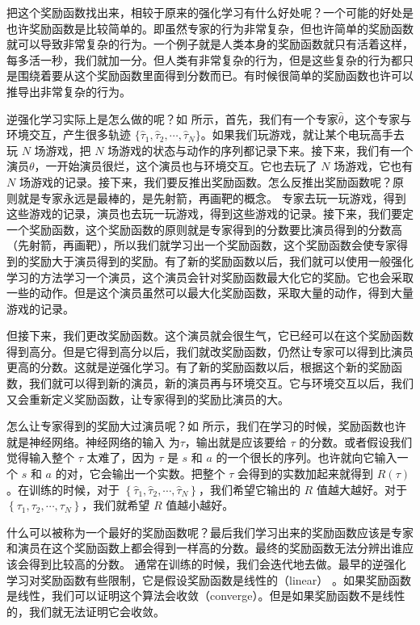 把这个奖励函数找出来，相较于原来的强化学习有什么好处呢？一个可能的好处是也许奖励函数是比较简单的。即虽然专家的行为非常复杂，但也许简单的奖励函数就可以导致非常复杂的行为。一个例子就是人类本身的奖励函数就只有活着这样，每多活一秒，我们就加一分。但人类有非常复杂的行为，但是这些复杂的行为都只是围绕着要从这个奖励函数里面得到分数而已。有时候很简单的奖励函数也许可以推导出非常复杂的行为。

逆强化学习实际上是怎么做的呢？如 所示，首先，我们有一个专家$\hat{\theta}$，这个专家与环境交互，产生很多轨迹 $\{\hat{\tau}_1,\hat{\tau}_2,\cdots,\hat{\tau}_N\}$。如果我们玩游戏，就让某个电玩高手去玩 $N$ 场游戏，把 $N$ 场游戏的状态与动作的序列都记录下来。接下来，我们有一个演员$\theta$，一开始演员很烂，这个演员也与环境交互。它也去玩了 $N$ 场游戏，它也有 $N$ 场游戏的记录。接下来，我们要反推出奖励函数。怎么反推出奖励函数呢？原则就是专家永远是最棒的，是先射箭，再画靶的概念。
专家去玩一玩游戏，得到这些游戏的记录，演员也去玩一玩游戏，得到这些游戏的记录。接下来，我们要定一个奖励函数，这个奖励函数的原则就是专家得到的分数要比演员得到的分数高（先射箭，再画靶），所以我们就学习出一个奖励函数，这个奖励函数会使专家得到的奖励大于演员得到的奖励。有了新的奖励函数以后，我们就可以使用一般强化学习的方法学习一个演员，这个演员会针对奖励函数最大化它的奖励。它也会采取一些的动作。但是这个演员虽然可以最大化奖励函数，采取大量的动作，得到大量游戏的记录。

但接下来，我们更改奖励函数。这个演员就会很生气，它已经可以在这个奖励函数得到高分。但是它得到高分以后，我们就改奖励函数，仍然让专家可以得到比演员更高的分数。这就是逆强化学习。有了新的奖励函数以后，根据这个新的奖励函数，我们就可以得到新的演员，新的演员再与环境交互。它与环境交互以后，我们又会重新定义奖励函数，让专家得到的奖励比演员的大。

怎么让专家得到的奖励大过演员呢？如 所示，我们在学习的时候，奖励函数也许就是神经网络。神经网络的输入 为$\tau$，输出就是应该要给 $\tau$ 的分数。或者假设我们觉得输入整个 $\tau$ 太难了，因为 $\tau$ 是 $s$ 和 $a$ 的一个很长的序列。也许就向它输入一个 $s$ 和 $a$ 的对，它会输出一个实数。把整个 $\tau$ 会得到的实数加起来就得到 $R(\tau)$。在训练的时候，对于 $\left\{\hat{\tau}_{1}, \hat{\tau}_{2}, \cdots, \hat{\tau}_{N}\right\}$，我们希望它输出的 $R$ 值越大越好。对于 $\left\{\tau_{1}, \tau_{2}, \cdots, \tau_{N}\right\}$，我们就希望 $R$ 值越小越好。

什么可以被称为一个最好的奖励函数呢？最后我们学习出来的奖励函数应该是专家和演员在这个奖励函数上都会得到一样高的分数。最终的奖励函数无法分辨出谁应该会得到比较高的分数。
通常在训练的时候，我们会迭代地去做。最早的逆强化学习对奖励函数有些限制，它是假设奖励函数是线性的（linear） 。如果奖励函数是线性，我们可以证明这个算法会收敛（converge）。但是如果奖励函数不是线性的，我们就无法证明它会收敛。
   
